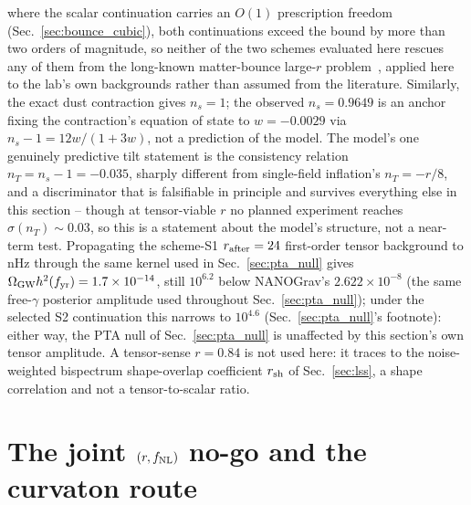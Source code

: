 \documentclass[aps,prd,twocolumn,superscriptaddress,nofootinbib,longbibliography]{revtex4-2}
\newcommand{\fnl}{f_{\rm NL}}
\newcommand{\OmGW}{\Omega_{\rm GW}}
\begin{document}
where the scalar continuation carries an $O(1)$ prescription freedom
(Sec.~\ref{sec:bounce_cubic}), both continuations exceed the bound by
more than two orders of magnitude, so neither of the two schemes
evaluated here rescues any of them from the long-known matter-bounce
large-$r$ problem~\cite{CaiEasson2012, Quintin2015}, applied here to the
lab's own backgrounds rather than assumed from the literature.
Similarly, the exact dust contraction gives $n_s=1$; the observed
$n_s=0.9649$ is an anchor fixing the contraction's equation of state to
$w=-0.0029$ via $n_s-1=12w/(1+3w)$, not a prediction of the model. The
model's one genuinely predictive tilt statement is the consistency
relation $n_T=n_s-1=-0.035$, sharply different from single-field
inflation's $n_T=-r/8$, and a discriminator that is falsifiable in
principle and survives everything else in this section -- though at
tensor-viable $r$ no planned experiment reaches $\sigma(n_T)\sim0.03$,
so this is a statement about the model's structure, not a near-term test. Propagating the
scheme-S1 $r_{\rm after}=24$ first-order tensor background to nHz through
the same kernel used in
Sec.~\ref{sec:pta_null} gives $\OmGW h^2(f_{\rm yr})=1.7\times10^{-14}$,
still $10^{6.2}$ below NANOGrav's $2.622\times10^{-8}$ (the same
free-$\gamma$ posterior amplitude used throughout Sec.~\ref{sec:pta_null});
under the selected S2 continuation this narrows to $10^{4.6}$
(Sec.~\ref{sec:pta_null}'s footnote): either way,
the PTA null of
Sec.~\ref{sec:pta_null} is unaffected by this section's own tensor
amplitude. A tensor-sense $r=0.84$ is not used here: it traces to the
noise-weighted bispectrum shape-overlap coefficient $r_{\rm sh}$ of
Sec.~\ref{sec:lss}, a shape correlation and not a tensor-to-scalar
ratio.

\section{The joint $(r,\fnl)$ no-go and the curvaton route}
\label{sec:nogo}
\end{document}
